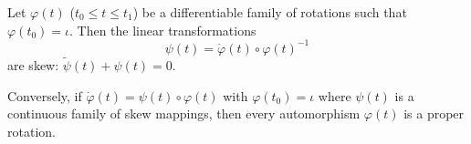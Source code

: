 Let $\varphi(t)$ ($t_0 \leq t \leq t_1$) be a differentiable family of rotations such that $\varphi(t_0) = \iota$. Then the linear transformations
$$\psi(t) = \dot{\varphi}(t) \circ \varphi(t)^{-1}$$
are skew: $\tilde{\psi}(t) + \psi(t) = 0$.

Conversely, if $\dot{\varphi}(t) = \psi(t) \circ \varphi(t)$ with $\varphi(t_0) = \iota$ where $\psi(t)$ is a continuous family of skew mappings, then every automorphism $\varphi(t)$ is a proper rotation.
